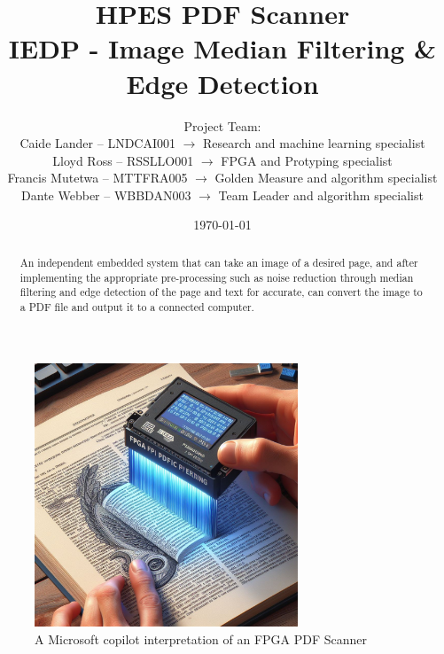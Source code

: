 \documentclass{article}
\begin{document}
\title{\textbf{HPES PDF Scanner \\ IEDP - Image Median Filtering \& Edge Detection}}
\author{\textcolor{gray!150}{Project Team:} \\
\textcolor{gray!150}{Caide Lander – LNDCAI001 $\rightarrow$ Research and machine learning specialist}\\
\textcolor{gray!150}{Lloyd Ross – RSSLLO001 $\rightarrow$ FPGA and Protyping specialist} \\
\textcolor{gray!150}{Francis Mutetwa – MTTFRA005 $\rightarrow$ Golden Measure and algorithm specialist}\\
\textcolor{gray!150}{Dante Webber – WBBDAN003 $\rightarrow$ Team Leader and algorithm specialist}}
\date{\today}

\maketitle

\begin{abstract}
    An independent embedded system that can take an image of a desired page, and after implementing the appropriate pre-processing 
    such as noise reduction through median filtering and edge detection of the page and text for accurate, can convert the image to 
    a PDF file and output it to a connected computer.
\end{abstract}

\begin{figure}[H]
    \centering
    \includegraphics[width=0.7\textwidth]{Images/OIG1.jpeg}
    \caption{A Microsoft copilot interpretation of an FPGA PDF Scanner}
    \label{fig:Figure 1}
\end{figure}
\end{document}
